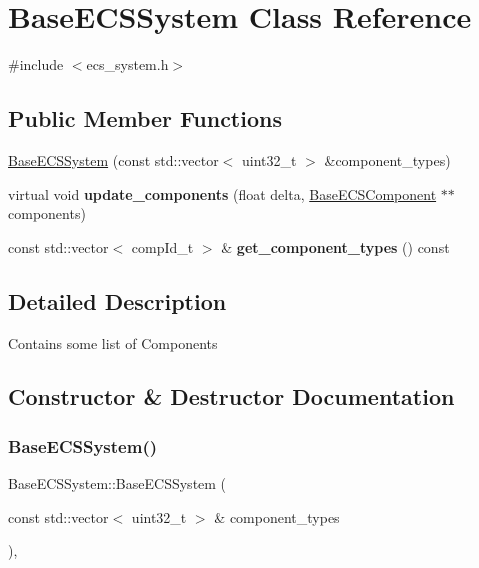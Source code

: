 \hypertarget{classBaseECSSystem}{}\section{Base\+E\+C\+S\+System Class Reference}
\label{classBaseECSSystem}


{\ttfamily \#include $<$ecs\+\_\+system.\+h$>$}

\subsection*{Public Member Functions}
\begin{DoxyCompactItemize}
\item 
\hyperlink{classBaseECSSystem_a49236e9978a881706f566a1c28c6312a}{Base\+E\+C\+S\+System} (const std\+::vector$<$ uint32\+\_\+t $>$ \&component\+\_\+types)
\item 
\mbox{\label{classBaseECSSystem_aed82b94e1d49e05bbd8088d298de9ffd}} 
virtual void {\bfseries update\+\_\+components} (float delta, \hyperlink{classBaseECSComponent}{Base\+E\+C\+S\+Component} $\ast$$\ast$components)
\item 
\mbox{\label{classBaseECSSystem_ae04365a31e7aa78a20b9d6e5d262e884}} 
const std\+::vector$<$ comp\+Id\+\_\+t $>$ \& {\bfseries get\+\_\+component\+\_\+types} () const
\end{DoxyCompactItemize}


\subsection{Detailed Description}
Contains some list of Components 

\subsection{Constructor \& Destructor Documentation}
\mbox{\label{classBaseECSSystem_a49236e9978a881706f566a1c28c6312a}} 
\subsubsection{\texorpdfstring{Base\+E\+C\+S\+System()}{BaseECSSystem()}}
{\footnotesize\ttfamily Base\+E\+C\+S\+System\+::\+Base\+E\+C\+S\+System (\begin{DoxyParamCaption}\item[{const std\+::vector$<$ uint32\+\_\+t $>$ \&}]{component\+\_\+types }\end{DoxyParamCaption})\hspace{0.3cm}{\ttfamily [inline]}, {\ttfamily [explicit]}}


